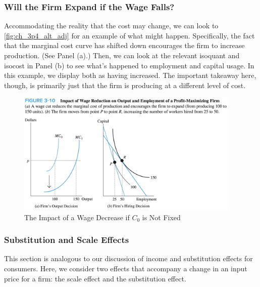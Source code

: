 \FloatBarrier

\subsubsection{Will the Firm Expand if the Wage Falls?}

Accommodating the reality that 
the cost may change, we can look
to \autoref{fig:ch_3p4_alt_adj} for an example 
of what might happen.
Specifically, the fact that the marginal cost 
curve has shifted down encourages the 
firm to increase production. (See Panel (a).)
Then, we can look at the relevant isoquant and isocost 
in Panel (b) to see what's happened to employment 
and capital usage. In this example, we display 
both as having increased. The important takeaway here, 
though, is primarily just that the firm is 
producing at a different level of cost.

\FloatBarrier

\begin{figure}[!htb]
    \centering
        \includegraphics[width=0.95\textwidth]{../input/ch_3p4_alt_adj.png}
    \caption{The Impact of a Wage Decrease if $C_0$ is Not Fixed}
    \label{fig:ch_3p4_alt_adj}
\end{figure}

\FloatBarrier

\subsubsection{Substitution and Scale Effects}

This section is analogous to our discussion 
of income and substitution effects for 
consumers. Here, we consider two effects that 
accompany a change in an input price for a 
firm: the scale effect and the substitution effect.

